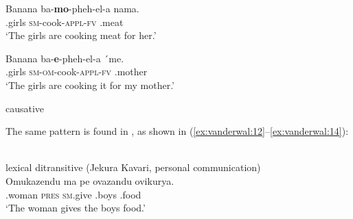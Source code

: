 \documentclass[output=paper]{LSP/langsci}
\begin{document}
 \ex\label{ex:vanderwal:10b}
\gll Banana  ba-\textbf{mo}{}-pheh-el-a  nama.\\
    .girls  \textsc{sm}{}-cook-\textsc{appl}{}-\textsc{fv}  .meat\\
    \glt ‘The girls are cooking meat for her.’

 \ex\label{ex:vanderwal:10c}
\gll Banana  ba-\textbf{e}{}-pheh-el-a  ´me.\\
    .girls  \textsc{sm-om}{}-cook-\textsc{appl}{}-\textsc{fv}  .mother \\
    \glt ‘The girls are cooking it for my mother.’
\z
\z

\ea\label{ex:vanderwal:11}%

     {causative \citep[31]{Machobane1989}}\\


\z
\z

The same pattern is found in , as shown in (\ref{ex:vanderwal:12}--\ref{ex:vanderwal:14}):

\noindent {}\\
\ea\label{ex:vanderwal:12}
  {lexical ditransitive (Jekura Kavari, personal communication)}\\
 \ea\label{ex:vanderwal:12a}
\gll Omukazendu  ma  pe  ovazandu  ovikurya.\\
    .woman  \textsc{pres}  \textsc{sm}.give  .boys  .food\\
    \glt ‘The woman gives the boys food.’
\end{document}
